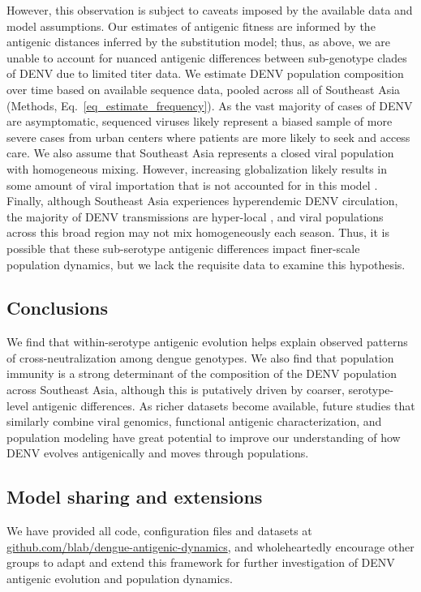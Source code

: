 \documentclass[11pt,oneside,letterpaper]{article}
\begin{document}
However, this observation is subject to caveats imposed by the available data and model assumptions.
Our estimates of antigenic fitness are informed by the antigenic distances inferred by the substitution model; thus, as above, we are unable to account for nuanced antigenic differences between sub-genotype clades of DENV due to limited titer data.
We estimate DENV population composition over time based on available sequence data, pooled across all of Southeast Asia (Methods, Eq.~\ref{eq_estimate_frequency}).
As the vast majority of cases of DENV are asymptomatic, sequenced viruses likely represent a biased sample of more severe cases from urban centers where patients are more likely to seek and access care.
We also assume that Southeast Asia represents a closed viral population with homogeneous mixing.
However, increasing globalization likely results in some amount of viral importation that is not accounted for in this model \citep{allicock2012phylogeography}.
Finally, although Southeast Asia experiences hyperendemic DENV circulation, the majority of DENV transmissions are hyper-local \citep{salje2017dengue}, and viral populations across this broad region may not mix homogeneously each season.
Thus, it is possible that these sub-serotype antigenic differences impact finer-scale population dynamics, but we lack the requisite data to examine this hypothesis.

\subsection*{Conclusions}
We find that within-serotype antigenic evolution helps explain observed patterns of cross-neutralization among dengue genotypes.
We also find that population immunity is a strong determinant of the composition of the DENV population across Southeast Asia, although this is putatively driven by coarser, serotype-level antigenic differences.
As richer datasets become available, future studies that similarly combine viral genomics, functional antigenic characterization, and population modeling have great potential to improve our understanding of how DENV evolves antigenically and moves through populations.

\subsection*{Model sharing and extensions}
We have provided all code, configuration files and datasets at \href{https://github.com/blab/dengue-antigenic-dynamics}{github.com/blab/dengue-antigenic-dynamics}, and wholeheartedly encourage other groups to adapt and extend this framework for further investigation of DENV antigenic evolution and population dynamics.
\end{document}
